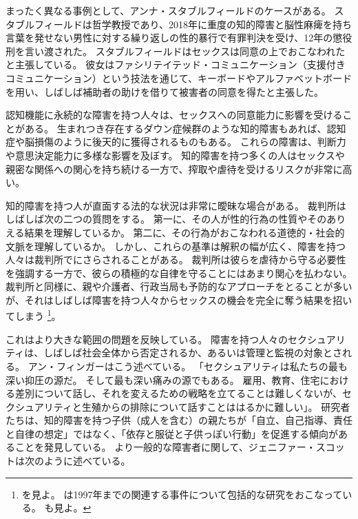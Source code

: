 \documentclass[paper=a4,book,openany]{jlreq}
\begin{document}
まったく異なる事例として、アンナ・スタブルフィールドのケースがある。
スタブルフィールドは哲学教授であり、2018年に重度の知的障害と脳性麻痺を持ち言葉を発せない男性に対する繰り返しの性的暴行で有罪判決を受け、12年の懲役刑を言い渡された。
スタブルフィールドはセックスは同意の上でおこなわれたと主張している。
彼女はファシリテイテッド・コミュニケーション（支援付きコミュニケーション）という技法を通じて、キーボードやアルファベットボードを用い、しばしば補助者の助けを借りて被害者の同意を得たと主張した\citep{engber15:_stran_case_anna_stubb}。

認知機能に永続的な障害を持つ人々は、セックスへの同意能力に影響を受けることがある。
生まれつき存在するダウン症候群のような知的障害もあれば、認知症や脳損傷のように後天的に獲得されるものもある。
これらの障害は、判断力や意思決定能力に多様な影響を及ぼす。
知的障害を持つ多くの人はセックスや親密な関係への関心を持ち続ける一方で、搾取や虐待を受けるリスクが非常に高い\citep{justice16:_crime_person_disab}。

知的障害を持つ人が直面する法的な状況は非常に曖昧な場合がある。
裁判所はしばしば次の二つの質問をする。
第一に、その人が性的行為の性質やそのありえる結果を理解しているか。
第二に、その行為がおこなわれる道徳的・社会的文脈を理解しているか。
しかし、これらの基準は解釈の幅が広く、障害を持つ人々は裁判所でにさらされることがある。
裁判所は彼らを虐待から守る必要性を強調する一方で、彼らの積極的な自律を守ることにはあまり関心を払わない。
裁判所と同様に、親や介護者、行政当局も予防的なアプローチをとることが多いが、それはしばしば障害を持つ人々からセックスの機会を完全に奪う結果を招いてしまう\nocite{appel10:_sex_right_disab} \footnote{\citet{appel10:_sex_right_disab}を見よ。
\citet{denno97:_sexual_rape_mental_retar}は1997年までの関連する事件について包括的な研究をおこなっている。
\citet[p.86]{kulick15:_lonel_its_oppos}も見よ。
}。

これはより大きな範囲の問題を反映している。
障害を持つ人々のセクシュアリティは、しばしば社会全体から否定されるか、あるいは管理と監視の対象とされる。
アン・フィンガーはこう述べている。
「セクシュアリティは私たちの最も深い抑圧の源だ。
そして最も深い痛みの源でもある。
雇用、教育、住宅における差別について話し、それを変えるための戦略を立てることは難しくないが、セクシュアリティと生殖からの排除について話すことははるかに難しい」\citep[p.9]{finger92:_forbid_fruit}。
研究者たちは、知的障害を持つ子供（成人を含む）の親たちが「自立、自己指導、責任と自律の想定」ではなく、「依存と服従と子供っぽい行動」を促進する傾向があることを発見している\citep[p.196]{mill10:_negot_auton_famil}。
より一般的な障害者に関して、ジェニファー・スコットは次のように述べている。
\end{document}
